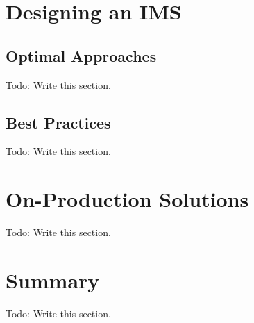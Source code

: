 \section{Designing an IMS}

\subsection{Optimal Approaches}

Todo: Write this section.

\subsection{Best Practices}

Todo: Write this section.


\section{On-Production Solutions}

Todo: Write this section.


\section{Summary}

Todo: Write this section.